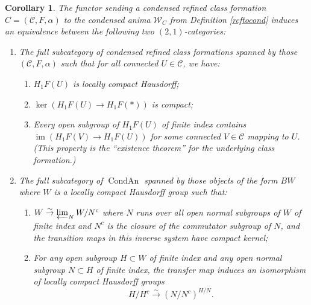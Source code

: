 \documentclass[12pt]{article}
\newtheorem{corollary}[theorem]{Corollary}
\theoremstyle{definition}
\newcommand{\on}{\operatorname}
\newcommand{\mc}{\mathcal}
\begin{document}
\begin{corollary}\label{weildeterminesrcf}
The functor sending a condensed refined class formation $C = (\mc{C},F,\alpha)$ to the condensed anima $\mc{W}_C$
from Definition \ref{rcftocond} induces an equivalence between the following two $(2,1)$-categories:
\begin{enumerate}
\item The full subcategory of condensed refined class formations spanned by those $(\mc{C},F,\alpha)$ such that for all connected $U\in\mc{C}$, we have:
\begin{enumerate}
\item $H_1F(U)$ is locally compact Hausdorff;
\item $\on{ker}(H_1F(U)\to H_1F(\ast))$ is compact;
\item Every open subgroup of $H_1F(U)$ of finite index contains $\on{im}(H_1F(V)\to H_1F(U))$ for some connected $V\in\mc{C}$ mapping to $U$. (This property is the ``existence theorem'' for the underlying class formation.)
\end{enumerate}

\item The full subcategory of $\on{CondAn}$ spanned by those objects of the form $BW$ where $W$ is a locally compact Hausdorff group such that:
\begin{enumerate}
\item $W\overset{\sim}{\rightarrow}\varprojlim_N W/N^c$ where $N$ runs over all open normal subgroups of $W$ of finite index and $N^c$ is the closure of the commutator subgroup of $N$, and the transition maps in this inverse system have compact kernel;
\item For any open subgroup $H\subset W$ of finite index and any open normal subgroup $N\subset H$ of finite index, the transfer map induces an isomorphism of locally compact Hausdorff groups
$$H/H^c\overset{\sim}{\rightarrow} (N/N^c)^{H/N}.$$

\end{enumerate}
\end{enumerate}
\end{corollary}
\end{document}
